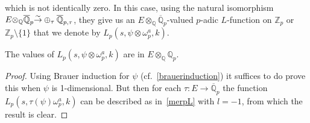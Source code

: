 \documentclass{amsart}
\begin{document}
which is not identically zero.
In this case, using the natural isomorphism $ E{\otimes}_{\mathbb Q}{{\overline {\mathbb Q}_p}} {\buildrel{\sim}\over{\rightarrow}} \oplus_{\tau} \overline{\mathbb Q}_{p,{\tau}} $,
they give us an $ E{\otimes}_{\mathbb Q} {{\overline {\mathbb Q}_p}} $-valued {$p$-adic{\futurelet{}}} {$L$-function{\futurelet{}}} on $ {\mathbb Z_p} $ or $ {\mathbb Z_p}\setminus\{1\} $
that we denote by $ {L_{p}(s,\psi{\otimes}\omega_p^a,k)}$.

\begin{lemma}\label{pLvalueslemma}
The values of $ {L_{p}(s,\psi{\otimes}\omega_p^a,k)}$ are in $ E{\otimes}_{\mathbb Q} {{\mathbb Q_p}} $.
\end{lemma}

\begin{proof}
Using Brauer induction for $ \psi $ (cf.~\eqref{brauerinduction}) it suffices to do prove this when $ \psi $
is 1-dimensional.  But then for each $ {\tau} : E \to {{\overline {\mathbb Q}_p}} $ the function $ {L_{p}(s,{\tau}(\psi)\omega_p^a,k)}$ can be described
as in~\eqref{merpL} with $ l=-1 $, from which the result is clear.
\end{proof}

\end{document}
